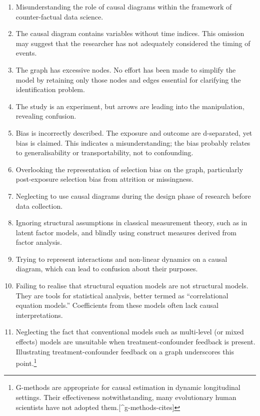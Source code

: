\documentclass[
  singlecolumn,
  9pt]{article}
\begin{document}
\begin{enumerate}
\def\labelenumi{\arabic{enumi}.}
\item
  Misunderstanding the role of causal diagrams within the framework of
  counter-factual data science.
\item
  The causal diagram contains variables without time indices. This
  omission may suggest that the researcher has not adequately considered
  the timing of events.
\item
  The graph has excessive nodes. No effort has been made to simplify the
  model by retaining only those nodes and edges essential for clarifying
  the identification problem.
\item
  The study is an experiment, but arrows are leading into the
  manipulation, revealing confusion.
\item
  Bias is incorrectly described. The exposure and outcome are
  d-separated, yet bias is claimed. This indicates a misunderstanding;
  the bias probably relates to generalisability or transportability, not
  to confounding.
\item
  Overlooking the representation of selection bias on the graph,
  particularly post-exposure selection bias from attrition or
  missingness.
\item
  Neglecting to use causal diagrams during the design phase of research
  before data collection.
\item
  Ignoring structural assumptions in classical measurement theory, such
  as in latent factor models, and blindly using construct measures
  derived from factor analysis.
\item
  Trying to represent interactions and non-linear dynamics on a causal
  diagram, which can lead to confusion about their purposes.
\item
  Failing to realise that structural equation models are not structural
  models. They are tools for statistical analysis, better termed as
  ``correlational equation models.'' Coefficients from these models
  often lack causal interpretations.
\item
  Neglecting the fact that conventional models such as multi-level (or
  mixed effects) models are unsuitable when treatment-confounder
  feedback is present. Illustrating treatment-confounder feedback on a
  graph underscores this point.\footnote{G-methods are appropriate for
    causal estimation in dynamic longitudinal settings. Their
    effectiveness notwithstanding, many evolutionary human scientists
    have not adopted them.{[}\^{}g-methods-cites{]}}
\end{enumerate}
\end{document}
